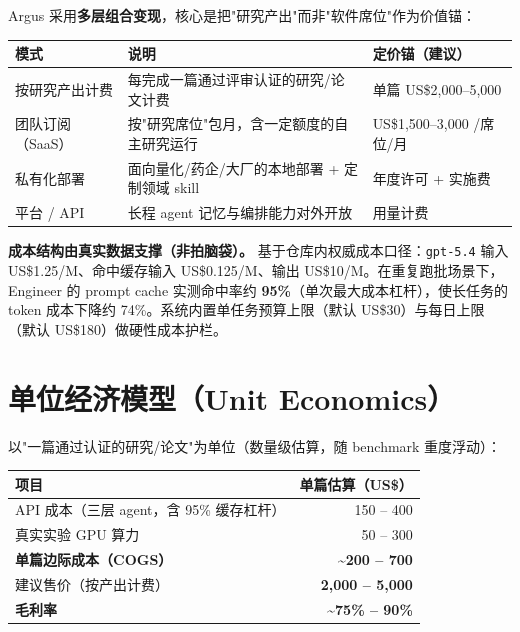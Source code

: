 \documentclass[UTF8,11pt,fontset=none]{ctexart}
\newcommand{\hl}[1]{\textbf{\color{argusnavy}#1}}
\newcommand{\thd}[1]{\textbf{\color{white}#1}}
\newcommand{\headrow}{\rowcolor{argusnavy}}
\newcommand{\altrow}{\rowcolor{arguslight}}
\begin{document}
Argus 采用\textbf{多层组合变现}，核心是把"研究产出"而非"软件席位"作为价值锚：

\begin{tabularx}{\textwidth}{@{}>{\raggedright\arraybackslash}p{3.6cm} X >{\raggedright\arraybackslash}p{3.4cm}@{}}
\toprule
\headrow \thd{模式} & \thd{说明} & \thd{定价锚（建议）} \\
\midrule
\altrow 按研究产出计费 & 每完成一篇通过评审认证的研究/论文计费 & 单篇 US\$2,000–5,000 \\
团队订阅（SaaS） & 按"研究席位"包月，含一定额度的自主研究运行 & US\$1,500–3,000 /席位/月 \\
\altrow 私有化部署 & 面向量化/药企/大厂的本地部署 + 定制领域 skill & 年度许可 + 实施费 \\
平台 / API & 长程 agent 记忆与编排能力对外开放 & 用量计费 \\
\bottomrule
\end{tabularx}

\textbf{成本结构由真实数据支撑（非拍脑袋）。} 基于仓库内权威成本口径：\texttt{gpt-5.4} 输入 US\$1.25/M、命中缓存输入 US\$0.125/M、输出 US\$10/M。在重复跑批场景下，Engineer 的 prompt cache 实测命中率约 \hl{95\%}（单次最大成本杠杆），使长任务的 token 成本下降约 74\%。系统内置单任务预算上限（默认 US\$30）与每日上限（默认 US\$180）做硬性成本护栏。

\section{单位经济模型（Unit Economics）}

以"一篇通过认证的研究/论文"为单位（数量级估算，随 benchmark 重度浮动）：

\begin{tabularx}{\textwidth}{@{}X r@{}}
\toprule
\headrow \thd{项目} & \thd{单篇估算（US\$）} \\
\midrule
\altrow API 成本（三层 agent，含 95\% 缓存杠杆） & 150 – 400 \\
真实实验 GPU 算力 & 50 – 300 \\
\altrow \textbf{单篇边际成本（COGS）} & \textbf{\textasciitilde 200 – 700} \\
\midrule
建议售价（按产出计费） & \textbf{2,000 – 5,000} \\
\altrow \textbf{毛利率} & \textbf{\textasciitilde 75\% – 90\%} \\
\bottomrule
\end{tabularx}
\end{document}

